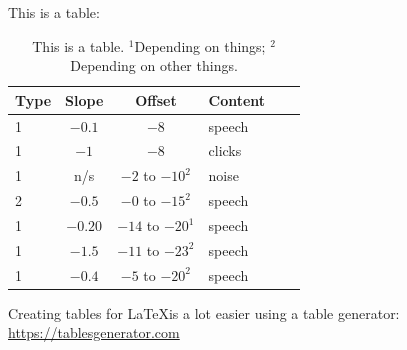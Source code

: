 This is a table:
\begin{table}[h!]
	\small
	\centering
	\begin{tabular}{l c c l l l}
		\toprule
		\textbf{Type}  &\textbf{Slope} &\textbf{Offset}     &\textbf{Content}    \\\midrule
		1        &$-0.1$        &$-8$              		& speech          	\\
		1        &$-1$        &$-8$              		& clicks         	   \\
		1        &n/s           	 &$-2$ to $-10^2$    & noise         	   	\\
		2        &$-0.5$      &$-0$ to $-15^2$    & speech				\\
		1        &$-0.20$       &$-14$ to $-20^1$  & speech				\\
		1        &$-1.5$       &$-11$ to $-23^2$ & speech   \\
		1        &$-0.4$       &$-5$ to $-20^2$   & speech	 \\\bottomrule
	\end{tabular}
	\caption{This is a table. {\footnotesize $^1$Depending on things; $^2$Depending on other things.}}
	\label{tab:Offset_slope}
\end{table}

Creating tables for \LaTeX is a lot easier using a table generator: \\
\url{https://tablesgenerator.com}